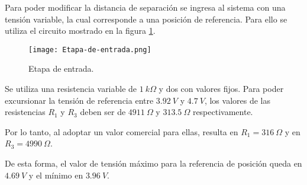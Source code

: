 \noindent Para poder modificar la distancia de separación se ingresa al sistema con una tensión variable, la cual corresponde a una posición de referencia. Para ello se utiliza el circuito mostrado en la figura \ref{fig:etapa-de-entrada}.

\begin{figure}[H]
	\centering
	\texttt{[image: Etapa-de-entrada.png]}
	\caption{ Etapa de entrada.}
	\label{fig:etapa-de-entrada}
\end{figure}

 
 \noindent Se utiliza una resistencia variable de $1\:k\Omega$ y dos con valores fijos. Para poder excursionar la tensión de referencia entre $3.92\:V$ y $4.7\:V$, los valores de las resistencias $R_1$ y $R_3$ deben ser de $4911\:\Omega$ y $313.5\:\Omega$ respectivamente. 
 
\noindent Por lo tanto, al adoptar un valor comercial para ellas, resulta en $R_1 = 316 \:\Omega$ y en $R_3 = 4990 \:\Omega$.
 
\noindent De esta forma, el valor de tensión máximo para la referencia de posición queda en $4.69\:V$ y el mínimo en $3.96\:V$.
 
